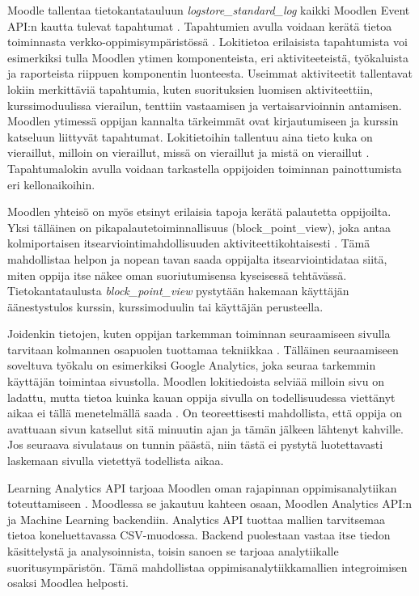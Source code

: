 Moodle tallentaa tietokantatauluun \emph{logstore\_standard\_log} kaikki Moodlen Event API:n kautta tulevat tapahtumat \citep{dougiamasMoodle2022, dougiamasLoggingMoodleDocs2021}. Tapahtumien avulla voidaan kerätä tietoa toiminnasta verkko-oppimisympäristössä \citep{agudo-peregrinaCanWePredict2014}. Lokitietoa erilaisista tapahtumista voi esimerkiksi tulla Moodlen ytimen komponenteista, eri aktiviteeteistä, työkaluista ja raporteista riippuen komponentin luonteesta. Useimmat aktiviteetit tallentavat lokiin merkittäviä tapahtumia, kuten suorituksien luomisen aktiviteettiin, kurssimoduulissa vierailun, tenttiin vastaamisen ja vertaisarvioinnin antamisen. Moodlen ytimessä oppijan kannalta tärkeimmät ovat kirjautumiseen ja kurssin katseluun liittyvät tapahtumat. Lokitietoihin tallentuu aina tieto kuka on vieraillut, milloin on vieraillut, missä on vieraillut ja mistä on vieraillut \citep{abdullahLearningStyleClassification2015}. Tapahtumalokin avulla voidaan tarkastella oppijoiden toiminnan painottumista eri kellonaikoihin.

Moodlen yhteisö on myös etsinyt erilaisia tapoja kerätä palautetta oppijoilta. Yksi tälläinen on pikapalautetoiminnallisuus (block\_point\_view), joka antaa kolmiportaisen itsearviointimahdollisuuden aktiviteettikohtaisesti \citep{fombaronMoodlePluginPoint2021}. Tämä mahdollistaa helpon ja nopean tavan saada oppijalta itsearviointidataa siitä, miten oppija itse näkee oman suoriutumisensa kyseisessä tehtävässä. Tietokantataulusta \emph{block\_point\_view} pystytään hakemaan käyttäjän äänestystulos kurssin, kurssimoduulin tai käyttäjän perusteella.

Joidenkin tietojen, kuten oppijan tarkemman toiminnan seuraamiseen sivulla tarvitaan kolmannen osapuolen tuottamaa tekniikkaa \citep{filvaGoogleAnalyticsTime2014}. Tälläinen seuraamiseen soveltuva työkalu on esimerkiksi Google Analytics, joka seuraa tarkemmin käyttäjän toimintaa sivustolla. Moodlen lokitiedoista selviää milloin sivu on ladattu, mutta tietoa kuinka kauan oppija sivulla on todellisuudessa viettänyt aikaa ei tällä menetelmällä saada \citep{dougiamasMoodle2022}. On teoreettisesti mahdollista, että oppija on avattuaan sivun katsellut sitä minuutin ajan ja tämän jälkeen lähtenyt kahville. Jos seuraava sivulataus on tunnin päästä, niin tästä ei pystytä luotettavasti laskemaan sivulla vietettyä todellista aikaa.

Learning Analytics API tarjoaa Moodlen oman rajapinnan oppimisanalytiikan toteuttamiseen \citep{oliveSupervisedLearningFramework2018}. Moodlessa se jakautuu kahteen osaan, Moodlen Analytics API:n ja Machine Learning backendiin. Analytics API tuottaa mallien tarvitsemaa tietoa koneluettavassa CSV-muodossa. Backend puolestaan vastaa itse tiedon käsittelystä ja analysoinnista, toisin sanoen se tarjoaa analytiikalle suoritusympäristön. Tämä mahdollistaa oppimisanalytiikkamallien integroimisen osaksi Moodlea helposti.


